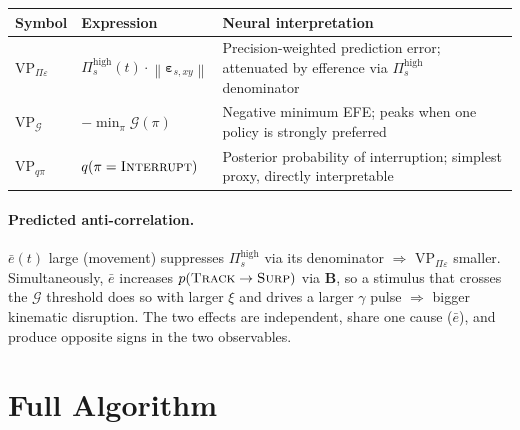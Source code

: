 \documentclass[11pt, a4paper]{article}
\newcommand{\vect}[1]{\bm{#1}}
\newcommand{\mat}[1]{\mathbf{#1}}
\newcommand{\EFE}{\mathcal{G}}
\newcommand{\norm}[1]{\left\|#1\right\|}
\newcommand{\Pish}{\Pi_s^{\mathrm{high}}}
\begin{document}
\begin{center}
\renewcommand{\arraystretch}{1.5}
\begin{tabular}{llp{5.5cm}}
\toprule
\textbf{Symbol} & \textbf{Expression} & \textbf{Neural interpretation} \\
\midrule
$\mathrm{VP}_{\Pi\varepsilon}$ &
  $\Pish(t)\cdot\norm{\vect{\varepsilon}_{s,xy}}$ &
  Precision-weighted prediction error;
  attenuated by efference via $\Pish$ denominator \\
$\mathrm{VP}_{\EFE}$ &
  $-\min_\pi \EFE(\pi)$ &
  Negative minimum EFE; peaks when one policy is strongly preferred \\
$\mathrm{VP}_{q\pi}$ &
  $q(\pi=\textsc{Interrupt})$ &
  Posterior probability of interruption;
  simplest proxy, directly interpretable \\
\bottomrule
\end{tabular}
\end{center}

\paragraph{Predicted anti-correlation.}
$\bar{e}(t)$ large (movement) suppresses $\Pish$ via its denominator
$\Rightarrow$ $\mathrm{VP}_{\Pi\varepsilon}$ smaller. Simultaneously,
$\bar{e}$ increases $p(\textsc{Track}\to\textsc{Surp})$ via $\mat{B}$,
so a stimulus that crosses the $\EFE$ threshold does so with larger $\xi$
and drives a larger $\gamma$ pulse $\Rightarrow$ bigger kinematic disruption.
The two effects are independent, share one cause ($\bar{e}$), and produce
opposite signs in the two observables.

\section{Full Algorithm}
\end{document}
